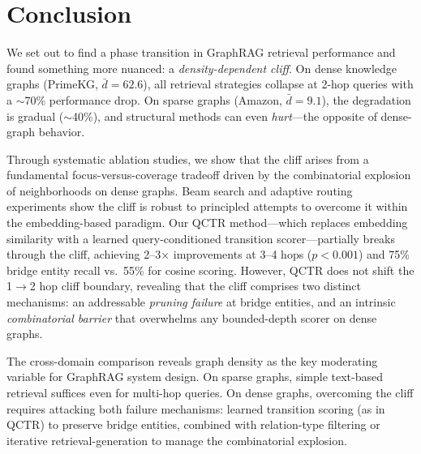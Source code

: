 \documentclass[11pt]{article}
\begin{document}
\section{Conclusion}

We set out to find a phase transition in GraphRAG retrieval performance and found something more nuanced: a \textit{density-dependent cliff}. On dense knowledge graphs (PrimeKG, $\bar{d} = 62.6$), all retrieval strategies collapse at 2-hop queries with a $\sim$70\% performance drop. On sparse graphs (Amazon, $\bar{d} = 9.1$), the degradation is gradual ($\sim$40\%), and structural methods can even \textit{hurt}---the opposite of dense-graph behavior.

Through systematic ablation studies, we show that the cliff arises from a fundamental focus-versus-coverage tradeoff driven by the combinatorial explosion of neighborhoods on dense graphs. Beam search and adaptive routing experiments show the cliff is robust to principled attempts to overcome it within the embedding-based paradigm. Our QCTR method---which replaces embedding similarity with a learned query-conditioned transition scorer---partially breaks through the cliff, achieving 2--3$\times$ improvements at 3--4 hops ($p < 0.001$) and 75\% bridge entity recall vs.\ 55\% for cosine scoring. However, QCTR does not shift the 1$\to$2 hop cliff boundary, revealing that the cliff comprises two distinct mechanisms: an addressable \textit{pruning failure} at bridge entities, and an intrinsic \textit{combinatorial barrier} that overwhelms any bounded-depth scorer on dense graphs.

The cross-domain comparison reveals graph density as the key moderating variable for GraphRAG system design. On sparse graphs, simple text-based retrieval suffices even for multi-hop queries. On dense graphs, overcoming the cliff requires attacking both failure mechanisms: learned transition scoring (as in QCTR) to preserve bridge entities, combined with relation-type filtering or iterative retrieval-generation to manage the combinatorial explosion.
\end{document}
